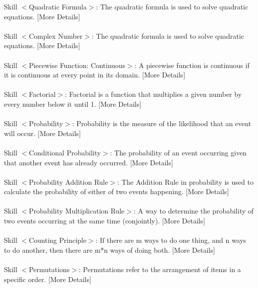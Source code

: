 \documentclass{article} %
\begin{document}
\begin{tcolorbox}[title = {Skills for MATH}, colback = Apricot!25!white, colframe = BrickRed!75!black,fontupper =\fontsize{7.5pt}{6pt}\selectfont]
Skill $<$Quadratic Formula$>$: The quadratic formula is used to solve quadratic equations. $[$More Details$]$\\ \\


Skill $<$Complex Number$>$: The quadratic formula is used to solve quadratic equations. $[$More Details$]$\\ \\

Skill $<$Piecewise Function: Continuous$>$: A piecewise function is continuous if it is continuous at every point in its domain. $[$More Details$]$\\ \\

Skill $<$Factorial$>$:  Factorial is a function that multiplies a given number by every number below it until 1. $[$More Details$]$\\ \\

Skill $<$Probability$>$:   Probability is the measure of the likelihood that an event will occur. $[$More Details$]$\\ \\

Skill $<$Conditional Probability$>$: The probability of an event occurring given that another event has already occurred.  $[$More Details$]$\\ \\

Skill $<$Probability Addition Rule$>$: The Addition Rule in probability is used to calculate the probability of either of two events happening. $[$More Details$]$\\ \\

Skill $<$Probability Multiplication Rule$>$: A way to determine the probability of two events occurring at the same time (conjointly). $[$More Details$]$\\ \\

Skill $<$Counting Principle$>$: If there are m ways to do one thing, and n ways to do another, then there are m*n ways of doing both. $[$More Details$]$\\ \\

Skill $<$Permutations$>$: Permutations refer to the arrangement of items in a specific order. $[$More Details$]$\\ \\


\end{tcolorbox}
\end{document}
